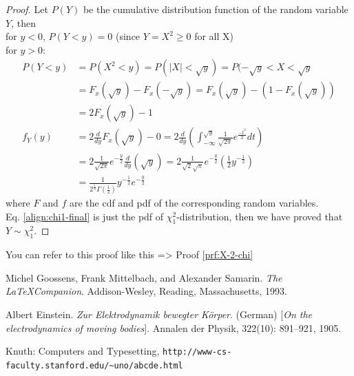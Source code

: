 \documentclass[10pt, a4paper, oneside]{article}
\begin{document}
\begin{proof}\label{prf:X-2-chi}
Let $P(Y)$ be the cumulative distribution function of the random variable $Y$, then \\
for $y < 0$, $P(Y < y) = 0$ (since $Y = X^{2} \geq 0$ for all X) \\
for $y > 0$:
\begin{align}
P(Y < y) &= P(X^{2} < y) = P(|X| < \sqrt{y}) = P(-\sqrt{y} < X < \sqrt{y} \nonumber \\
         &= F_{x}(\sqrt{y}) - F_{x}(-\sqrt{y}) = F_{x}(\sqrt{y}) - (1 - F_{x}(\sqrt{y})) \nonumber \\
         & = 2F_{x}(\sqrt{y}) - 1 \nonumber \\
f_{Y}(y) &= 2\frac{d}{dy}F_{x}(\sqrt{y}) - 0 = 2\frac{d}{dy}(\int^{\sqrt{y}}_{-\infty}\frac{1}{\sqrt{2\pi}}e^{\frac{-t^{2}}{2}}dt) \nonumber \\
         &= 2\frac{1}{\sqrt{2\pi}}e^{-\frac{y}{2}}\frac{d}{dy}(\sqrt{y}) = 2\frac{1}{\sqrt{2}\sqrt{\pi}}e^{-\frac{y}{2}}(\frac{1}{2}y^{-\frac{1}{2}}) \nonumber \\
         &= \frac{1}{2^{\frac{1}{2}}\Gamma(\frac{1}{2})}y^{-\frac{1}{2}}e^{-\frac{y}{2}} \label{align:chi1-final}
\end{align}
where $F$ and $f$ are the cdf and pdf of the corresponding random variables. \\
Eq. \ref{align:chi1-final} is just the pdf of $\chi^{2}_{1}$-distribution, then we have proved that $Y  \sim \chi^{2}_{1}$.
\end{proof}

You can refer to this proof like this =\textgreater{} Proof \ref{prf:X-2-chi}

\renewcommand\refname{References}
\begin{thebibliography}{9}\label{thebibliography}

Michel Goossens, Frank Mittelbach, and Alexander Samarin. \emph{The \LaTeX Companion}. Addison-Wesley, Reading, Massachusetts, 1993.

Albert Einstein. \emph{Zur Elektrodynamik bewegter Körper}. (German) {[}\emph{On the electrodynamics of moving bodies}{]}. Annalen der Physik, 322(10): 891--921, 1905.

Knuth: Computers and Typesetting, \newline \texttt{http://www-cs-faculty.stanford.edu/\textasciitilde{}uno/abcde.html}

\end{thebibliography}

\printindex
\end{document}
